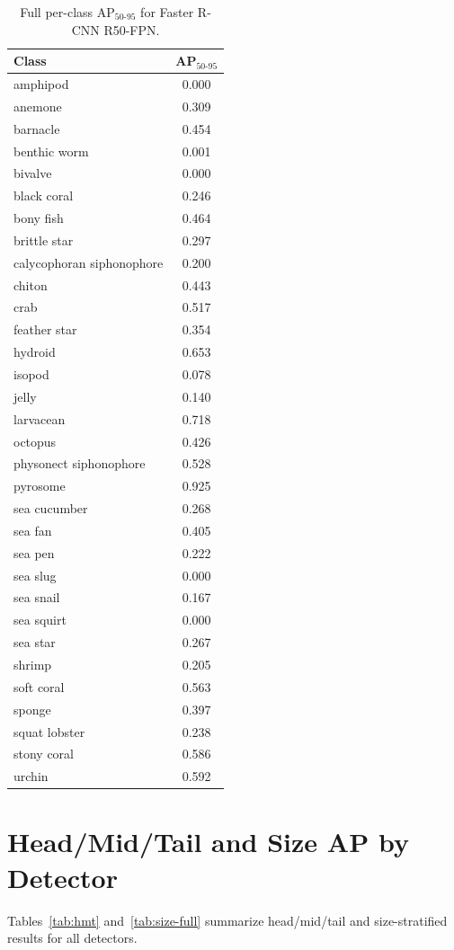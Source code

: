 \documentclass[11pt,a4paper]{article}
\begin{document}
\begin{table}[H]
\centering
\small
\caption{Full per-class AP$_{50\text{-}95}$ for Faster R-CNN R50-FPN.}
\label{tab:perclass-full}
\begin{tabular}{@{}lc@{}}
\toprule
Class & AP$_{50\text{-}95}$ \\
\midrule
amphipod & 0.000 \\
anemone & 0.309 \\
barnacle & 0.454 \\
benthic worm & 0.001 \\
bivalve & 0.000 \\
black coral & 0.246 \\
bony fish & 0.464 \\
brittle star & 0.297 \\
calycophoran siphonophore & 0.200 \\
chiton & 0.443 \\
crab & 0.517 \\
feather star & 0.354 \\
hydroid & 0.653 \\
isopod & 0.078 \\
jelly & 0.140 \\
larvacean & 0.718 \\
octopus & 0.426 \\
physonect siphonophore & 0.528 \\
pyrosome & 0.925 \\
sea cucumber & 0.268 \\
sea fan & 0.405 \\
sea pen & 0.222 \\
sea slug & 0.000 \\
sea snail & 0.167 \\
sea squirt & 0.000 \\
sea star & 0.267 \\
shrimp & 0.205 \\
soft coral & 0.563 \\
sponge & 0.397 \\
squat lobster & 0.238 \\
stony coral & 0.586 \\
urchin & 0.592 \\
\bottomrule
\end{tabular}
\end{table}

\section{Head/Mid/Tail and Size AP by Detector}
\label{app:grouping}
Tables~\ref{tab:hmt} and~\ref{tab:size-full} summarize head/mid/tail and size-stratified results for all detectors.
\end{document}
